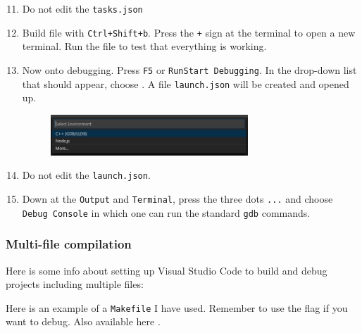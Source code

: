 \begin{enumerate}
    \setcounter{enumi}{10}

    \item Do not edit the \texttt{tasks.json}
    
    \item Build file with \texttt{Ctrl+Shift+b}. Press the \texttt{+} sign at the terminal to open a new terminal. Run the file  to test that everything is working.
    
    \item Now onto debugging. Press \texttt{F5} or \texttt{Run\ra Start Debugging}. In the drop-down list that should appear, choose . A file \texttt{launch.json} will be created and opened up.

    \begin{figure}[H]
        \centering
        \includegraphics[width=0.7\textwidth]{figures/vscode_debugger.PNG}
    \end{figure}

    \item Do not edit the \texttt{launch.json}.
    
    \item Down at the \texttt{Output} and \texttt{Terminal}, press the three dots \texttt{...} and choose \texttt{Debug Console} in which one can run the standard \texttt{gdb} commands.
    
\end{enumerate}

\subsubsection{Multi-file compilation}

Here is some info about setting up Visual Studio Code to build and debug projects including multiple files:


Here is an example of a \texttt{Makefile} I have used. Remember to use the  flag if you want to debug. Also available here .

